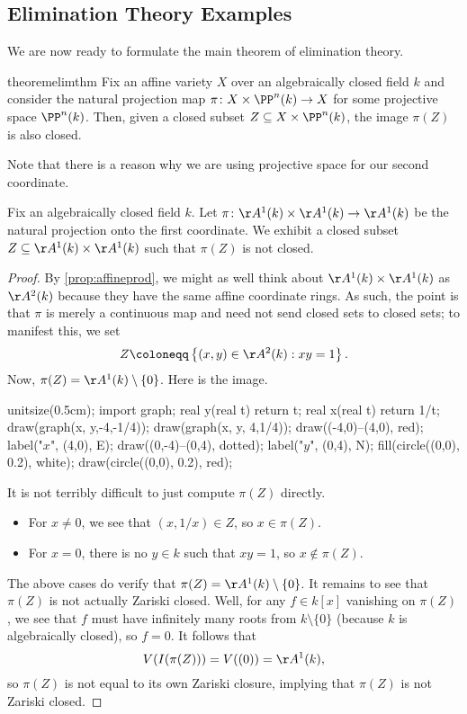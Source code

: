 \documentclass[../notes.tex]{subfiles}
\begin{document}
\subsection{Elimination Theory Examples}
We are now ready to formulate the main theorem of elimination theory.
\begin{restatable}{theorem}{elimthm} \label{thm:elim}
	Fix an affine variety $X$ over an algebraically closed field $k$ and consider the natural projection map $\pi\colon X\times\PP^n(k)\to X$ for some projective space $\PP^n(k)$. Then, given a closed subset $Z\subseteq X\times\PP^n(k)$, the image $\pi (Z)$ is also closed.
\end{restatable}
Note that there is a reason why we are using projective space for our second coordinate.
\begin{exe} \label{exe:elimnex}
	Fix an algebraically closed field $k$. Let $\pi\colon\AA^1(k)\times\AA^1(k)\to\AA^1(k)$ be the natural projection onto the first coordinate. We exhibit a closed subset $Z\subseteq\AA^1(k)\times\AA^1(k)$ such that $\pi(Z)$ is not closed.
\end{exe}
\begin{proof}
	By \autoref{prop:affineprod}, we might as well think about $\AA^1(k)\times\AA^1(k)$ as $\AA^2(k)$ because they have the same affine coordinate rings. As such, the point is that $\pi$ is merely a continuous map and need not send closed sets to closed sets; to manifest this, we set
	\[Z\coloneqq\left\{(x,y)\in\AA^2(k):xy=1\right\}.\]
	Now, $\pi(Z)=\AA^1(k)\setminus\{0\}$. Here is the image.
	\begin{center}
		\begin{asy}
			unitsize(0.5cm);
			import graph;
			real y(real t)
			{
				return t;
			}
			real x(real t)
			{
				return 1/t;
			}
			draw(graph(x, y,-4,-1/4));
			draw(graph(x, y, 4,1/4));
			draw((-4,0)--(4,0), red); label("$x$", (4,0), E);
			draw((0,-4)--(0,4), dotted); label("$y$", (0,4), N);
			fill(circle((0,0), 0.2), white);
			draw(circle((0,0), 0.2), red);
		\end{asy}
	\end{center}
	It is not terribly difficult to just compute $\pi\left(Z\right)$ directly.
	\begin{itemize}
		\item For $x\ne0$, we see that $(x,1/x)\in Z$, so $x\in\pi(Z)$.
		\item For $x=0$, there is no $y\in k$ such that $xy=1$, so $x\notin\pi(Z)$.
	\end{itemize}
	The above cases do verify that $\pi(Z)=\AA^1(k)\setminus\{0\}$. It remains to see that $\pi(Z)$ is not actually Zariski closed. Well, for any $f\in k[x]$ vanishing on $\pi(Z)$, we see that $f$ must have infinitely many roots from $k\setminus\{0\}$ (because $k$ is algebraically closed), so $f=0$. It follows that
	\[V(I(\pi(Z)))=V((0))=\AA^1(k),\]
	so $\pi(Z)$ is not equal to its own Zariski closure, implying that $\pi(Z)$ is not Zariski closed.
\end{proof}
\end{document}
